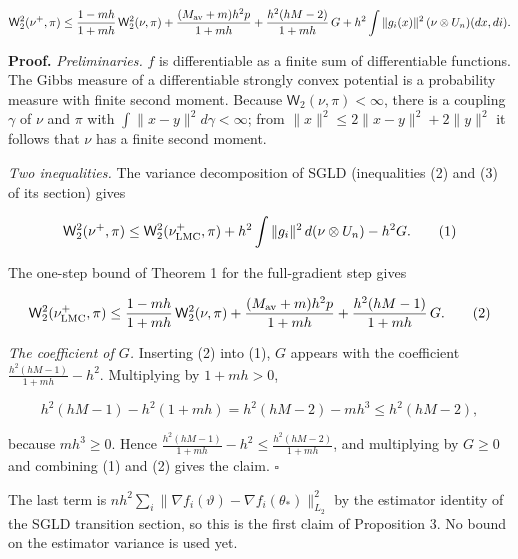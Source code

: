 \documentclass[11pt,a4paper]{article}
\begin{document}
\[\mathsf W_2^2(\nu^+,\pi)\le\frac{1-mh}{1+mh}\,\mathsf W_2^2(\nu,\pi)+\frac{(M_{\rm av}+m)h^2p}{1+mh}+\frac{h^2(hM-2)}{1+mh}\,G+h^2\int\|g_i(x)\|^2\,(\nu\otimes U_n)(dx,di).\]


\textbf{Proof.} \emph{Preliminaries.} \(f\) is differentiable as a finite sum of differentiable functions. The Gibbs measure of a differentiable strongly convex potential is a probability measure with finite second moment. Because \(\mathsf W_2(\nu,\pi)<\infty\), there is a coupling \(\gamma\) of \(\nu\) and \(\pi\) with \(\int\|x-y\|^2d\gamma<\infty\); from \(\|x\|^2\le2\|x-y\|^2+2\|y\|^2\) it follows that \(\nu\) has a finite second moment.




\emph{Two inequalities.} The variance decomposition of SGLD (inequalities (2) and (3) of its section) gives


\[\mathsf W_2^2(\nu^+,\pi)\le\mathsf W_2^2(\nu^+_{\rm LMC},\pi)+h^2\int\|g_i\|^2\,d(\nu\otimes U_n)-h^2G.\qquad(1)\]


The one-step bound of Theorem 1 for the full-gradient step gives


\[\mathsf W_2^2(\nu^+_{\rm LMC},\pi)\le\frac{1-mh}{1+mh}\,\mathsf W_2^2(\nu,\pi)+\frac{(M_{\rm av}+m)h^2p}{1+mh}+\frac{h^2(hM-1)}{1+mh}\,G.\qquad(2)\]


\emph{The coefficient of \(G\).} Inserting (2) into (1), \(G\) appears with the coefficient \(\frac{h^2(hM-1)}{1+mh}-h^2\). Multiplying by \(1+mh>0\),


\[h^2(hM-1)-h^2(1+mh)=h^2(hM-2)-mh^3\le h^2(hM-2),\]


because \(mh^3\ge0\). Hence \(\frac{h^2(hM-1)}{1+mh}-h^2\le\frac{h^2(hM-2)}{1+mh}\), and multiplying by \(G\ge0\) and combining (1) and (2) gives the claim. \(\square\)




The last term is \(nh^2\sum_i\|\nabla f_i(\vartheta)-\nabla f_i(\theta_*)\|_{L_2}^2\) by the estimator identity of the SGLD transition section, so this is the first claim of Proposition 3. No bound on the estimator variance is used yet.
\end{document}
